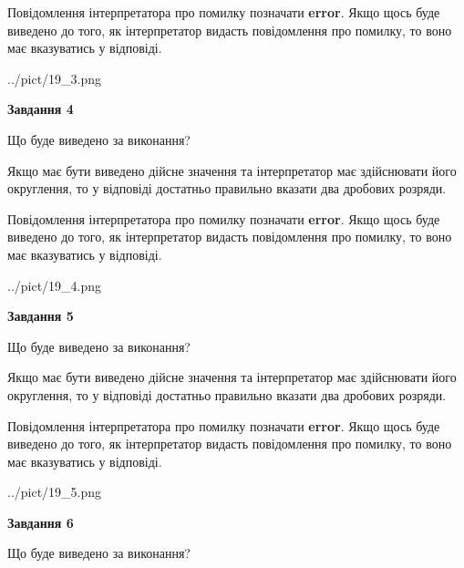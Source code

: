 \documentclass[12pt, ukrainian]{article}
\begin{document}
{\begin {Large}
Повідомлення інтерпретатора про помилку позначати \textbf{error}.
Якщо щось буде виведено до того, як інтерпретатор видасть повідомлення про помилку, 
то воно має вказуватись у відповіді. \par

\begin{center}
	{../pict/19_3.png}
\end{center}
\newpage

{\begin {center}\textbf{Завдання 4}\end {center}}\par
Що буде виведено за виконання? \par

Якщо має бути виведено дійсне значення та інтерпретатор має здійснювати його округлення, 
то у відповіді достатньо правильно вказати два дробових розряди.

Повідомлення інтерпретатора про помилку позначати \textbf{error}.
Якщо щось буде виведено до того, як інтерпретатор видасть повідомлення про помилку, 
то воно має вказуватись у відповіді. \par

\begin{center}
	{../pict/19_4.png}
\end{center}
\newpage

{\begin {center}\textbf{Завдання 5}\end {center}}\par
Що буде виведено за виконання? \par

Якщо має бути виведено дійсне значення та інтерпретатор має здійснювати його округлення, 
то у відповіді достатньо правильно вказати два дробових розряди.

Повідомлення інтерпретатора про помилку позначати \textbf{error}.
Якщо щось буде виведено до того, як інтерпретатор видасть повідомлення про помилку, 
то воно має вказуватись у відповіді. \par

\begin{center}
	{../pict/19_5.png}
\end{center}
\newpage

{\begin {center}\textbf{Завдання 6}\end {center}}\par
Що буде виведено за виконання? \par


\end{Large}}
\end{document}
